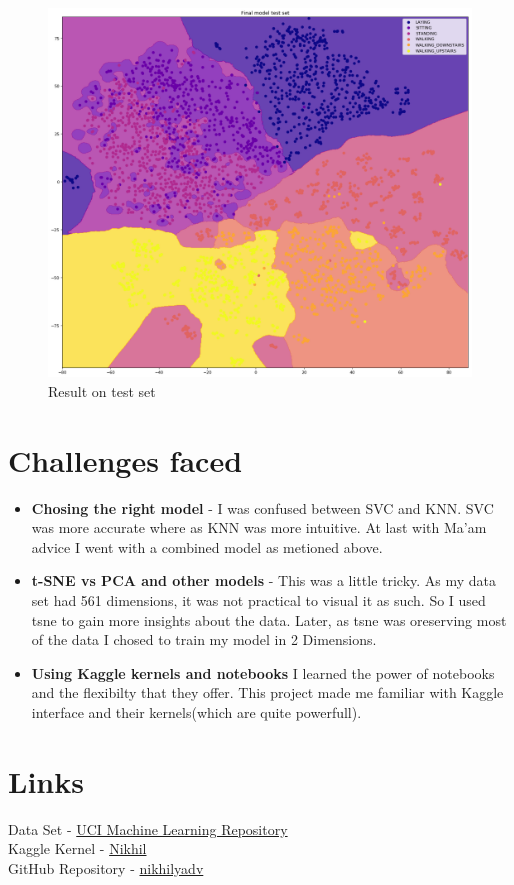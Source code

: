\documentclass[12pt]{article}
\begin{document}
\begin{figure}[H]
	\centering
	\includegraphics[scale=0.30]{result_test.png}
	\caption{Result on test set}
\end{figure}\noindent
\section{Challenges faced}
\begin{itemize}
	\item \textbf{Chosing the right model} - I was confused between SVC and KNN. SVC was more accurate where as KNN was more intuitive. At last with Ma'am advice I went with a combined model as metioned above.
	\item \textbf{t-SNE vs PCA and other models} - This was a little tricky. As my data set had 561 dimensions, it was not practical to visual it as such. So I used tsne to gain more insights about the data. Later, as tsne was oreserving most of the data I chosed to train my model in 2 Dimensions.
	\item \textbf{Using Kaggle kernels and notebooks} I learned the power of notebooks and the flexibilty that they offer. This project made me familiar with Kaggle interface and their kernels(which are quite powerfull).
\end{itemize}
\section{Links}
	Data Set - \href{https://archive.ics.uci.edu/ml/datasets/Human+Activity+Recognition+Using+Smartphones}{UCI Machine Learning Repository}\\
	Kaggle Kernel - \href{https://www.kaggle.com/nikhilyadv/kernelb8e59d4169}{Nikhil}\\
	GitHub Repository - \href{}{nikhilyadv}
\end{document}
